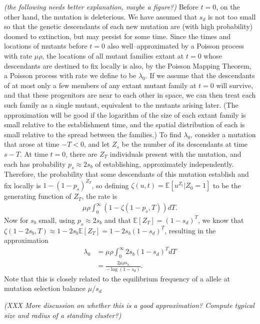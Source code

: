 \documentclass{article}
\newcommand{\plr}[1]{{\it\color{blue}(#1)}}
\newcommand{\E}{\mathbb{E}}
\begin{document}
\plr{the following needs better explanation, maybe a figure?}
Before $t=0$, on the other hand, the mutation is deleterious.
We have assumed that $s_d$ is not too small
so that the genetic descendants of each new mutation are (with high probability) doomed to extinction,
but may persist for some time.
Since the times and locations of mutants before $t=0$ also well--approximated by a Poisson process with rate $\mu \rho$,
the locations of all mutant families extant at $t=0$ whose descendants are destined to fix locally is also,
by the Poisson Mapping Theorem, a Poisson process with rate we define to be $\lambda_0$.
If we assume that the descendants of at most only a few members of any extant mutant family at $t=0$ will survive,
and that these progenitors are near to each other in space, we can then treat each such family as a single mutant,
equivalent to the mutants arising later.
(The approximation will be good if the logarithm of the size of each extant family is small relative to the establishment time,
and the spatial distribution of each is small relative to the spread between the families.)
To find $\lambda_0$, consider a mutation that arose at time $-T<0$, and let $Z_s$ be the number of its descendants at time $s-T$.
At time $t=0$, there are $Z_T$ individuals present with the mutation,
and each has probability $p_s \approx 2s_b$ of establishing, approximately independently.
Therefore, the probability that some descendants of this mutation establish and fix locally is $1-(1-p_s)^{Z_T}$,
so defining $\zeta(u,t) = \E[u^{Z_t} | Z_0=1 ]$ to be the generating function of $Z_T$,
the rate is
\begin{align*}
    \mu \rho \int_0^\infty \left( 1- \zeta(1-p_s,T) \right) dT .
\end{align*}
Now for $s_b$ small, using $p_s \approx 2s_b$ and that $\E[Z_T]=(1-s_d)^T$,
we know that $\zeta(1-2s_b,T) \approx 1-2s_b \E[Z_T] = 1-2s_b (1-s_d)^T$,
resulting in the approximation
\begin{align}
    \lambda_0 &= \mu \rho \int_0^\infty 2s_b (1-s_d)^{T} dT \\
        &= \frac{ 2 \mu \rho s_b }{ -\log(1-s_d) } .
\end{align}
Note that this is closely related to the equilibrium frequency of a
allele at mutation selection balance $\mu/s_d$ \citep{Haldane?}

\plr{XXX More discussion on whether this is a good approximation?  
Compute typical size and radius of a standing cluster?}
\end{document}
